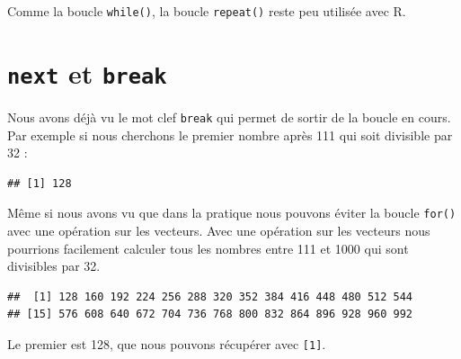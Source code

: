 \documentclass[twoside,symmetric]{book}
\newenvironment{Shaded}{}{}
\newcommand{\ControlFlowTok}[1]{\textbf{#1}}
\newcommand{\DecValTok}[1]{#1}
\newcommand{\KeywordTok}[1]{\textbf{#1}}
\newcommand{\NormalTok}[1]{#1}
\newcommand{\OperatorTok}[1]{#1}
\newcommand{\StringTok}[1]{#1}
\begin{document}
Comme la boucle \texttt{while()}, la boucle \texttt{repeat()} reste peu utilisée avec R.

\hypertarget{l17spe}{%
\section{\texorpdfstring{\texttt{next} et \texttt{break}}{next et break}}\label{l17spe}}

Nous avons déjà vu le mot clef \texttt{break} qui permet de sortir de la boucle en cours. Par exemple si nous cherchons le premier nombre après 111 qui soit divisible par 32 :

\begin{Shaded}
\end{Shaded}

\begin{verbatim}
## [1] 128
\end{verbatim}

Même si nous avons vu que dans la pratique nous pouvons éviter la boucle \texttt{for()} avec une opération sur les vecteurs. Avec une opération sur les vecteurs nous pourrions facilement calculer tous les nombres entre 111 et 1000 qui sont divisibles par 32.

\begin{Shaded}
\end{Shaded}

\begin{verbatim}
##  [1] 128 160 192 224 256 288 320 352 384 416 448 480 512 544
## [15] 576 608 640 672 704 736 768 800 832 864 896 928 960 992
\end{verbatim}

Le premier est 128, que nous pouvons récupérer avec \texttt{{[}1{]}}.
\end{document}
